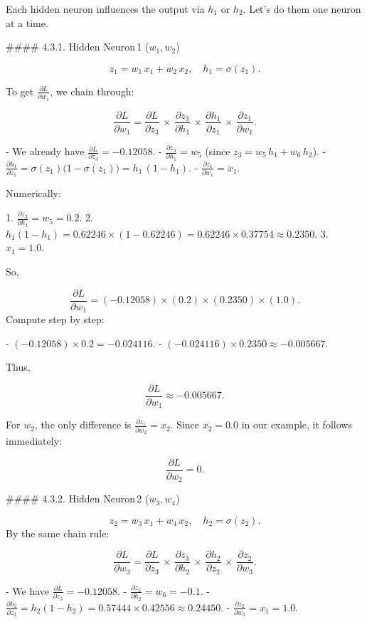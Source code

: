 Each hidden neuron influences the output via \(h_1\) or \(h_2\). Let’s do them one neuron at a time.

#### 4.3.1. Hidden Neuron 1 (\(w_1, w_2\))

\[
  z_1 = w_1\,x_1 + w_2\,x_2,
  \quad
  h_1 = \sigma(z_1).
\]

To get \(\tfrac{\partial L}{\partial w_1}\), we chain through:

\[
  \frac{\partial L}{\partial w_1}
  = \frac{\partial L}{\partial z_3} 
    \,\times\, \frac{\partial z_3}{\partial h_1}
    \,\times\, \frac{\partial h_1}{\partial z_1}
    \,\times\, \frac{\partial z_1}{\partial w_1}.
\]

- We already have \(\frac{\partial L}{\partial z_3} = -0.12058.\)
- \(\frac{\partial z_3}{\partial h_1} = w_5\) (since \(z_3 = w_5\,h_1 + w_6\,h_2\)).
- \(\frac{\partial h_1}{\partial z_1} = \sigma(z_1)\bigl(1 - \sigma(z_1)\bigr) = h_1\,(1 - h_1)\).
- \(\frac{\partial z_1}{\partial w_1} = x_1\).

Numerically:

1. \(\frac{\partial z_3}{\partial h_1} = w_5 = 0.2.\)
2. \(h_1(1 - h_1) = 0.62246 \times (1 - 0.62246) = 0.62246 \times 0.37754 \approx 0.2350.\)
3. \(x_1 = 1.0.\)

So,

\[
  \frac{\partial L}{\partial w_1}
  = (-0.12058)\times(0.2)\times(0.2350)\times(1.0).
\]
Compute step by step:

- \((-0.12058)\times 0.2 = -0.024116.\)
- \((-0.024116)\times 0.2350 \approx -0.005667.\)

Thus,

\[
  \frac{\partial L}{\partial w_1} \approx -0.005667.
\]

For \(w_2\), the only difference is \(\frac{\partial z_1}{\partial w_2} = x_2\). Since \(x_2 = 0.0\) in our example, it follows immediately:

\[
  \frac{\partial L}{\partial w_2} = 0.
\]

#### 4.3.2. Hidden Neuron 2 (\(w_3, w_4\))

\[
  z_2 = w_3\,x_1 + w_4\,x_2,\quad h_2 = \sigma(z_2).
\]
By the same chain rule:

\[
  \frac{\partial L}{\partial w_3}
  = \frac{\partial L}{\partial z_3}
    \,\times\, \frac{\partial z_3}{\partial h_2}
    \,\times\, \frac{\partial h_2}{\partial z_2}
    \,\times\, \frac{\partial z_2}{\partial w_3}.
\]

- We have \(\tfrac{\partial L}{\partial z_3} = -0.12058.\)
- \(\tfrac{\partial z_3}{\partial h_2} = w_6 = -0.1.\)
- \(\tfrac{\partial h_2}{\partial z_2} = h_2 (1 - h_2) = 0.57444\times 0.42556 \approx 0.24450.\)
- \(\tfrac{\partial z_2}{\partial w_3} = x_1 = 1.0.\)

